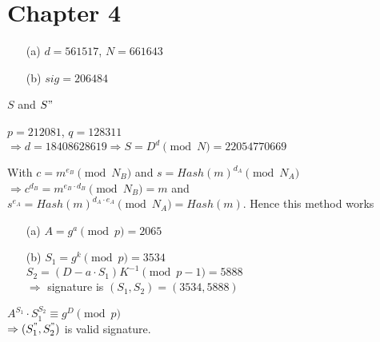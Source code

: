\chapter*{Chapter 4}

\begin{exer}[4.1]
	\begin{enumerate}
		\item [(a)] $d = 561517$, $N=661643$
		\item [(b)] $sig = 206484$
	\end{enumerate}
\end{exer}

\begin{exer}[4.2] $S$ and $S"$
\end{exer}

\begin{exer}[4.3] $p = 212081$, $q=128311$ \\ $\Rightarrow d = 18408628619 \Rightarrow S = D^d \pmod N = 22054770669$
\end{exer}

\begin{exer}[4.4] With $c = m^{e_B} \pmod{N_B}$ and $s = Hash(m)^{d_A} \pmod{N_A}$ \\ $\Rightarrow c^{d_B} = m^{e_B\cdot d_B} \pmod{N_B} = m$ and $s^{e_A} = Hash(m)^{d_A \cdot e_A} \pmod{N_A} = Hash(m)$. Hence this method works
\end{exer}

\begin{exer}[4.5]
	\begin{enumerate}
		\item [(a)] $A = g^a \pmod p = 2065$
		\item [(b)] $S_1 = g^k \pmod p = 3534$ \\ $S_2 = (D-a\cdot S_1)K^{-1} \pmod{p-1} = 5888$ \\ $\Rightarrow$ signature is $(S_1, S_2) = (3534, 5888)$
	\end{enumerate}
\end{exer}

\begin{exer}[4.6] $A^{S_1} \cdot S_1^{S_2} \equiv g^D \pmod p$ \\ $\Rightarrow (S_1^", S_2^")$ is valid signature.
\end{exer}

